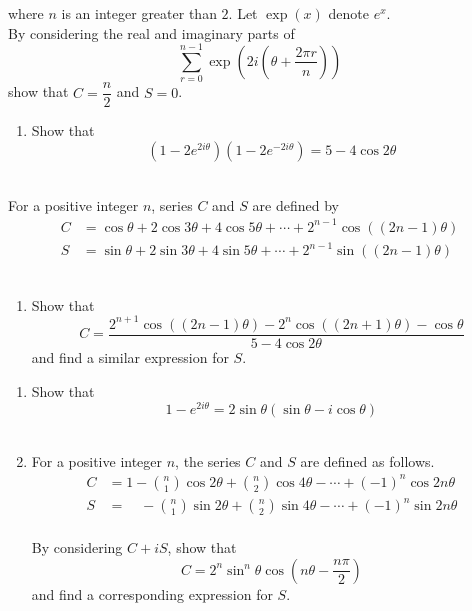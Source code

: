 \documentclass[leqno]{article}
\begin{document}
\begin{enumerate}[
  label=\textbf{\arabic*.},
  leftmargin=*,
  topsep=0pt,
  partopsep=0pt,
  parsep=0pt
]
where $n$ is an integer greater than $2$. Let $\exp(x)$ denote $e^x$.\\


By considering the real and imaginary parts of
\[
\sum_{r=0}^{n-1} \exp\left(2i\left(\theta + \dfrac{2\pi r}{n}\right)\right)
\]
show that $C= \dfrac{n}{2}$ and $S = 0$.  \\
\newpage

\questionitem

\begin{enumerate}[label=\textbf{(\roman*)}]
  \item Show that \[(1 - 2e^{2i\theta})(1 - 2e^{-2i\theta}) = 5 - 4\cos 2\theta\]  \\
\end{enumerate}

For a positive integer $n$, series $C$ and $S$ are defined by\\

\[
\begin{aligned}
C &= \cos\theta + 2\cos 3\theta + 4\cos 5\theta + \cdots + 2^{n-1}\cos((2n-1)\theta)\\[5pt]
S &= \sin\theta + 2\sin 3\theta + 4\sin 5\theta + \cdots + 2^{n-1}\sin((2n-1)\theta)
\end{aligned}
\] \\
\begin{enumerate}[label=\textbf{(\roman*)}, resume]
  \item Show that
  \[
  C = \frac{2^{n+1}\cos((2n-1)\theta) - 2^n\cos((2n+1)\theta) - \cos\theta}{5 - 4\cos 2\theta}
  \]
  and find a similar expression for $S$. 
\end{enumerate}
\newpage
\questionitem

\begin{enumerate}[label=\textbf{(\roman*)}]
  \item Show that
  \[
  1 - e^{2i\theta} = 2\sin\theta(\sin\theta - i\cos\theta)
  \] \\
  \item For a positive integer $n$, the series $C$ and $S$ are defined as follows.
  \begin{align*}
  C &= 1 - \binom{n}{1}\cos 2\theta + \binom{n}{2}\cos 4\theta - \cdots + (-1)^n\cos 2n\theta \\[5pt]
  S &=\quad -\binom{n}{1}\sin 2\theta + \binom{n}{2}\sin 4\theta - \cdots + (-1)^n\sin 2n\theta
  \end{align*} \\
  By considering $C + iS$, show that
  \[
  C = 2^n\sin^n\theta\cos\left(n\theta - \frac{n\pi}{2}\right)
  \]
  and find a corresponding expression for $S$. \\
\end{enumerate}

\newpage
\end{enumerate}
\end{document}
